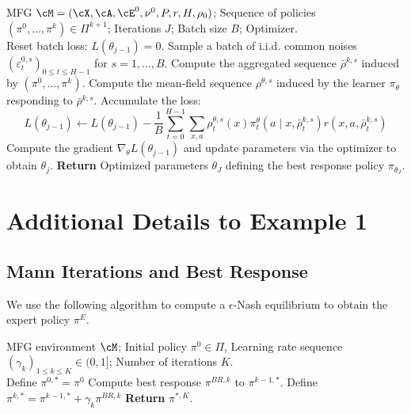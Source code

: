 \documentclass{article}
\theoremstyle{plain}
\begin{document}
\begin{algorithm}[htbp]
\caption{Neural Network Best Response}
\begin{algorithmic}[1]
\label{algo:nn_best_response}
\REQUIRE MFG $\cM = (\cX, \cA, \cE^0, \nu^0, P, r, H, \rho_0)$; Sequence of policies $(\pi^0, \dots, \pi^k) \in \Pi^{k+1}$; Iterations $J$; Batch size $B$; Optimizer. \\ 
    \STATE Reset batch loss: $L(\theta_{j-1}) = 0$.
    \STATE Sample a batch of i.i.d. common noises $(\varepsilon^{0, s}_t)_{0 \leq t \leq H-1}$ for $s=1, \dots, B$.
        \STATE Compute the aggregated sequence $\bar{\rho}^{k,s}$ induced by $(\pi^0, \dots, \pi^k)$.
        \STATE Compute the mean-field sequence $\rho^{\theta, s}$ induced by the learner $\pi_\theta$ responding to $\bar{\rho}^{k,s}$.
        \STATE Accumulate the loss:
        \[
        L(\theta_{j-1}) \leftarrow L(\theta_{j-1}) - \frac{1}{B} \sum_{t=0}^{H-1} \sum_{x, a} \rho^{\theta,s}_t(x) \pi^\theta_t(a \mid x, \bar{\rho}^{k,s}_t) r(x, a, \bar{\rho}^{k,s}_t)
        \]
    \ENDFOR
    \STATE Compute the gradient $\nabla_\theta L(\theta_{j-1})$ and update parameters via the optimizer to obtain $\theta_{j}$. 
\ENDFOR 
\STATE \textbf{Return} Optimized parameters $\theta_{J}$ defining the best response policy $\pi_{\theta_J}$.
\end{algorithmic}
\end{algorithm}


\clearpage

\section{Additional Details to Example 1}
\label{appendix:example1}

\subsection{Mann Iterations and Best Response}
We use the following algorithm to compute a $\epsilon$-Nash equilibrium to obtain the expert policy $\pi^E$. 
\begin{algorithm}[ht]
\caption{Mann Iteration for $\epsilon$-Nash Equilibrium}
\begin{algorithmic}[1]
\label{algo:mann_iteration_mfg}
\REQUIRE MFG environment $\cM$; Initial policy $\pi^0 \in \Pi$, Learning rate sequence $(\gamma_k)_{1\leq k\leq K} \in (0, 1]$; Number of iterations $K$. \\ 
\STATE Define $\pi^{0,*} = \pi^0$
    \STATE Compute best response $\pi^{BR, k}$ to $\pi^{k-1,*}$. 
    \STATE Define $\pi^{k,*} = \pi^{k-1,*} + \gamma_k \pi^{BR, k}$
\ENDFOR
\STATE \textbf{Return} $\pi^{*,K}$.
\end{algorithmic}
\end{algorithm}
\end{document}
